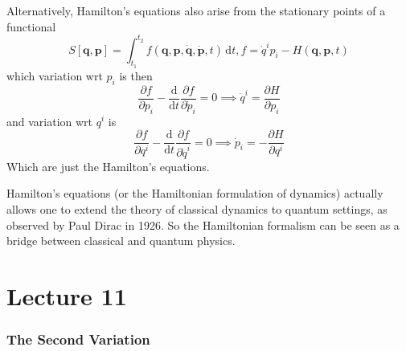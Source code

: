 \documentclass[a4paper]{article}
\begin{document}
Alternatively, Hamilton's equations also arise from the stationary points of a functional
$$S[\mathbf{q},\mathbf{p}]=\int_{t_1}^{t_2}f(\mathbf{q},\mathbf{p},\mathbf{\dot{q}},\mathbf{\dot{p}},t)\,\mathrm dt,f=\dot{q}^ip_i-H(\mathbf{q},\mathbf{p},t)$$
which variation wrt $p_i$ is then
$$\frac{\partial f}{\partial p_i}-\frac{\mathrm d}{\mathrm dt}\frac{\partial f}{\partial \dot{p}_i}=0\implies \dot{q}^i=\frac{\partial H}{\partial p_i}$$
and variation wrt $q^i$ is
$$\frac{\partial f}{\partial q^i}-\frac{\mathrm d}{\mathrm dt}\frac{\partial f}{\partial \dot{q}^i}=0\implies \dot{p}_i=-\frac{\partial H}{\partial q^i}$$
Which are just the Hamilton's equations.

Hamilton's equations (or the Hamiltonian formulation of dynamics) actually allows one to extend the theory of classical dynamics to quantum settings, as observed by Paul Dirac in 1926.
So the Hamiltonian formalism can be seen as a bridge between classical and quantum physics.
\newpage
\part*{Lecture 11}

\section{The Second Variation}
\end{document}
